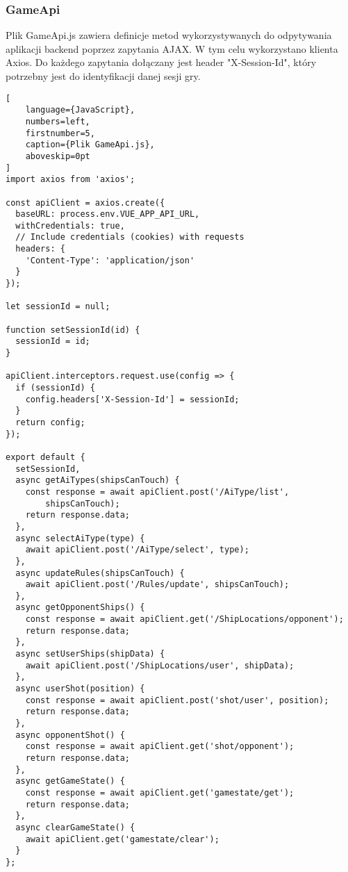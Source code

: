 \tocless\subsubsection{GameApi}
Plik GameApi.js zawiera definicje metod wykorzystywanych do odpytywania aplikacji backend poprzez zapytania AJAX. W tym celu wykorzystano klienta Axios. Do każdego zapytania dołączany jest header "X-Session-Id", który potrzebny jest do identyfikacji danej sesji gry.

\begin{addmargin}[0mm]{0mm}
\begin{lstlisting}[
    language={JavaScript},
    numbers=left,
    firstnumber=5,
    caption={Plik GameApi.js},
    aboveskip=0pt
]
import axios from 'axios';

const apiClient = axios.create({
  baseURL: process.env.VUE_APP_API_URL,
  withCredentials: true,
  // Include credentials (cookies) with requests
  headers: {
    'Content-Type': 'application/json'
  }
});

let sessionId = null;

function setSessionId(id) {
  sessionId = id;
}

apiClient.interceptors.request.use(config => {
  if (sessionId) {
    config.headers['X-Session-Id'] = sessionId;
  }
  return config;
});

export default {
  setSessionId,
  async getAiTypes(shipsCanTouch) {
    const response = await apiClient.post('/AiType/list',
        shipsCanTouch);
    return response.data;
  },
  async selectAiType(type) {
    await apiClient.post('/AiType/select', type);
  },
  async updateRules(shipsCanTouch) {
    await apiClient.post('/Rules/update', shipsCanTouch);
  },
  async getOpponentShips() {
    const response = await apiClient.get('/ShipLocations/opponent');
    return response.data;
  },
  async setUserShips(shipData) {
    await apiClient.post('/ShipLocations/user', shipData);
  },
  async userShot(position) {
    const response = await apiClient.post('shot/user', position);
    return response.data;
  },
  async opponentShot() {
    const response = await apiClient.get('shot/opponent');
    return response.data;
  },
  async getGameState() {
    const response = await apiClient.get('gamestate/get');
    return response.data;
  },
  async clearGameState() {
    await apiClient.get('gamestate/clear');
  }
};

\end{lstlisting}
\end{addmargin}

